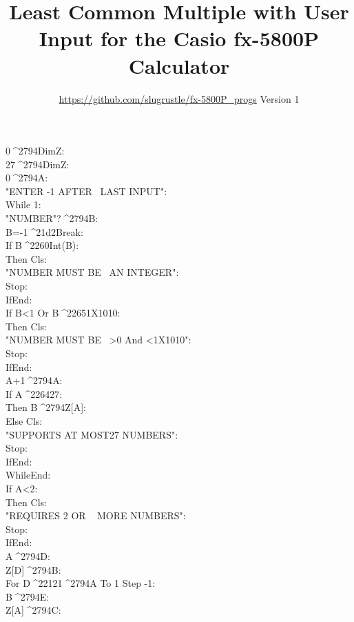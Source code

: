 \documentclass[11pt,letterpaper,twocolumn]{article}
\date{}
\newcommand{\STO}{{\large ^^^^2794}}
\newcommand{\CBR}{{\Large ^^^^21d2}}
\newcommand{\NEQ}{^^^^2260}
\newcommand{\LEQ}{^^^^2264}
\newcommand{\GEQ}{^^^^2265}
\newcommand{\MINUS}{^^^^2212}
\newcommand{\EXPTEN}{{\scriptsize X10}}
\newcommand{\IDENT}[1]{\hspace*{#1\BaseIndent}}
\begin{document}
\title{Least Common Multiple with User Input for the Casio fx-5800P Calculator}
\author{\url{https://github.com/slugrustle/fx-5800P_progs} \quad Version 1}
\maketitle
\thispagestyle{fancy}
\begin{linenumbers}
0\STO DimZ:\\
27\STO DimZ:\\
0\STO A:\\
"ENTER -1 AFTER ~LAST INPUT":\\
While 1:\\
\IDENT{1}"NUMBER"?\STO B:\\
\IDENT{1}B=-1\CBR Break:\\
\IDENT{1}If B\NEQ Int(B):\\
\IDENT{2}Then Cls:\\
\IDENT{2}"NUMBER MUST BE ~AN INTEGER":\\
\IDENT{2}Stop:\\
\IDENT{1}IfEnd:\\
\IDENT{1}If B<1 Or B\GEQ 1\EXPTEN 10:\\
\IDENT{2}Then Cls:\\
\IDENT{2}"NUMBER MUST BE ~>0 And <1\EXPTEN 10":\\
\IDENT{2}Stop:\\
\IDENT{1}IfEnd:\\
\IDENT{1}A+1\STO A:\\
\IDENT{1}If A\LEQ 27:\\
\IDENT{2}Then B\STO Z[A]:\\
\IDENT{1}Else Cls:\\
\IDENT{2}"SUPPORTS AT MOST27 NUMBERS":\\
\IDENT{2}Stop:\\
\IDENT{1}IfEnd:\\
WhileEnd:\\
If A<2:\\
\IDENT{1}Then Cls:\\
\IDENT{1}"REQUIRES 2 OR ~ MORE NUMBERS":\\
\IDENT{1}Stop:\\
IfEnd:\\
A\STO D:\\
Z[D]\STO B:\\
For D\MINUS 1\STO A To 1 Step -1:\\
\IDENT{1}B\STO E:\\
\IDENT{1}Z[A]\STO C:\\

\end{linenumbers}
\end{document}
